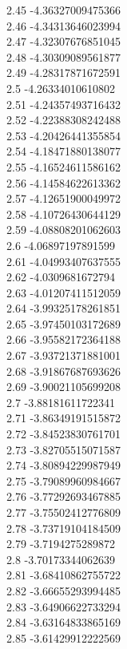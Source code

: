 {2.45	-4.36327009475366\\
2.46	-4.34313646023994\\
2.47	-4.32307676851045\\
2.48	-4.30309089561877\\
2.49	-4.28317871672591\\
2.5	-4.26334010610802\\
2.51	-4.24357493716432\\
2.52	-4.22388308242488\\
2.53	-4.20426441355854\\
2.54	-4.18471880138077\\
2.55	-4.16524611586162\\
2.56	-4.14584622613362\\
2.57	-4.12651900049972\\
2.58	-4.10726430644129\\
2.59	-4.08808201062603\\
2.6	-4.06897197891599\\
2.61	-4.04993407637555\\
2.62	-4.0309681672794\\
2.63	-4.01207411512059\\
2.64	-3.99325178261851\\
2.65	-3.97450103172689\\
2.66	-3.95582172364188\\
2.67	-3.93721371881001\\
2.68	-3.91867687693626\\
2.69	-3.90021105699208\\
2.7	-3.88181611722341\\
2.71	-3.86349191515872\\
2.72	-3.84523830761701\\
2.73	-3.82705515071587\\
2.74	-3.80894229987949\\
2.75	-3.79089960984667\\
2.76	-3.77292693467885\\
2.77	-3.75502412776809\\
2.78	-3.73719104184509\\
2.79	-3.7194275289872\\
2.8	-3.70173344062639\\
2.81	-3.68410862755722\\
2.82	-3.66655293994485\\
2.83	-3.64906622733294\\
2.84	-3.63164833865169\\
2.85	-3.61429912222569\\
}
